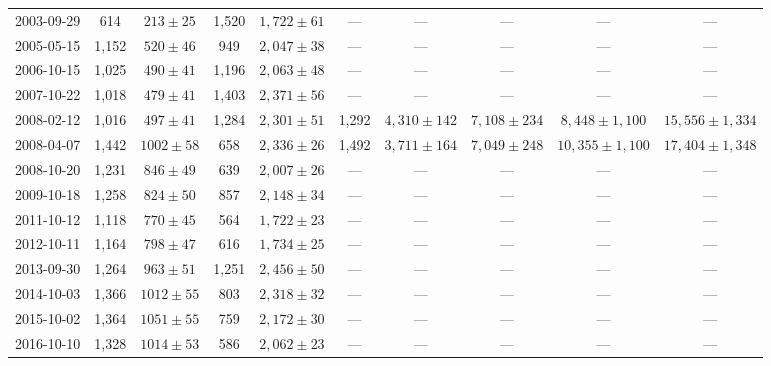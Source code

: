 \begin{landscape}
\begin{longtable}{cccccccccc}
{2003-09-29} & 614 & {$213  \pm  25$} & 1,520 & {$1,722 \pm 61$} & --- & --- & --- & --- & --- \\
{2005-05-15} & 1,152 & {$520  \pm  46$} & 949 & {$2,047 \pm 38$} & --- & --- & --- & --- & --- \\
{2006-10-15} & 1,025 & {$490  \pm  41$} & 1,196 & {$2,063 \pm 48$} & --- & --- & --- & --- & --- \\
{2007-10-22} & 1,018 & {$479  \pm  41$} & 1,403 & {$2,371 \pm 56$} & --- & --- & --- & --- & --- \\
{2008-02-12} & 1,016 & {$497  \pm  41$} & 1,284 & {$2,301 \pm 51$} & 1,292 & {$4,310 \pm 142$} & {$7,108 \pm 234$} & {$8,448 \pm 1,100$} & {$15,556 \pm 1,334$} \\
{2008-04-07} & 1,442 & {$1002  \pm  58$} & 658 & {$2,336 \pm 26$} & 1,492 & {$3,711 \pm 164$} & {$7,049 \pm 248$} & {$10,355 \pm 1,100$} & {$17,404 \pm 1,348$} \\
{2008-10-20} & 1,231 & {$846  \pm  49$} & 639 & {$2,007 \pm 26$} & --- & --- & --- & --- & --- \\
{2009-10-18} & 1,258 & {$824  \pm  50$} & 857 & {$2,148 \pm 34$} & --- & --- & --- & --- & --- \\
{2011-10-12} & 1,118 & {$770  \pm  45$} & 564 & {$1,722 \pm 23$} & --- & --- & --- & --- & --- \\
{2012-10-11} & 1,164 & {$798  \pm  47$} & 616 & {$1,734 \pm 25$} & --- & --- & --- & --- & --- \\
{2013-09-30} & 1,264 & {$963  \pm  51$} & 1,251 & {$2,456 \pm 50$} & --- & --- & --- & --- & --- \\
{2014-10-03} & 1,366 & {$1012  \pm  55$} & 803 & {$2,318 \pm 32$} & --- & --- & --- & --- & --- \\
{2015-10-02} & 1,364 & {$1051  \pm  55$} & 759 & {$2,172 \pm 30$} & --- & --- & --- & --- & --- \\
{2016-10-10} & 1,328 & {$1014  \pm  53$} & 586 & {$2,062 \pm 23$} & --- & --- & --- & --- & --- \\
\end{longtable} 
\end{landscape} 
